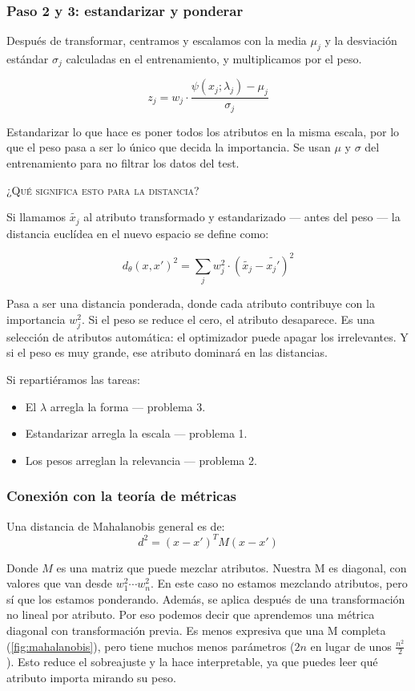 \subsubsection{Paso 2 y 3: estandarizar y ponderar}
Después de transformar, centramos y escalamos con la media $\mu_{j}$ y la desviación estándar $\sigma_{j}$ calculadas en el entrenamiento, y multiplicamos por el peso. 

$$ 
z_{j} = w_{j} \cdot \frac{\psi(x_{j}; \lambda_{j})-\mu_{j}}{\sigma_{j}}
$$

Estandarizar lo que hace es poner todos los atributos en la misma escala, por lo que el peso pasa a ser lo único que decida la importancia. Se usan $\mu$ y $\sigma$ del entrenamiento para no filtrar los datos del test. 

\textsc{¿Qué significa esto para la distancia?}

Si llamamos $\tilde{x_{j}}$ al atributo transformado y estandarizado --- antes del peso --- la distancia euclídea en el nuevo espacio se define como: 

$$ 
d_{\theta}(x, x')^2=\sum_{j}w_{j}^2 \cdot (\tilde{x_{j}}-\tilde{x_{j}'})^2
$$

Pasa a ser una distancia ponderada, donde cada atributo contribuye con la importancia $w_{j}^2$. Si el peso se reduce el cero, el atributo desaparece. Es una selección de atributos automática: el optimizador puede apagar los irrelevantes. Y si el peso es muy grande, ese atributo dominará en las distancias. 

Si repartiéramos las tareas: 
\begin{itemize}
    \item El $\lambda$ arregla la forma --- problema 3. 
    \item Estandarizar arregla la escala --- problema 1. 
    \item Los pesos arreglan la relevancia --- problema 2.
\end{itemize}

\subsubsection{Conexión con la teoría de métricas}
Una distancia de Mahalanobis general es de: 
$$ 
d^2  = (x-x')^{T} M (x-x')
$$

Donde $M$ es una matriz que puede mezclar atributos. Nuestra M es diagonal, con valores que van desde $w_{1}^2 \cdots w_{n}^2$. En este caso no estamos mezclando atributos, pero sí que los estamos ponderando. Además, se aplica después de una transformación no lineal por atributo. Por eso podemos decir que aprendemos una métrica diagonal con transformación previa. Es menos expresiva que una M completa (\autoref{fig:mahalanobis}), pero tiene muchos menos parámetros ($2n$ en lugar de unos $\frac{n^2}{2}$). Esto reduce el sobreajuste y la hace interpretable, ya que puedes leer qué atributo importa mirando su peso. 

